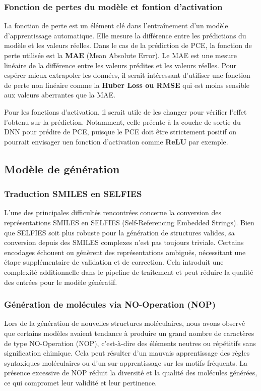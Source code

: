 \subsubsection{Fonction de pertes du modèle et fontion d'activation}
La fonction de perte est un élément clé dans l'entraînement d'un modèle d'apprentissage automatique.
Elle mesure la différence entre les prédictions du modèle et les valeurs réelles.
Dans le cas de la prédiction de PCE, la fonction de perte utilisée est la \textbf{MAE} (Mean Absolute Error).
Le MAE est une mesure linéaire de la différence entre les valeurs prédites et les valeurs réelles.
Pour espérer mieux extrapoler les données, il serait intéressant d'utiliser une fonction de perte non linéaire comme la \textbf{Huber Loss ou RMSE} qui est moins sensible aux valeurs aberrantes que la MAE.

Pour les fonctions d'activation, il serait utile de les changer pour vérifier l'effet l'obtenu sur la prédiction.
Notamment, celle préente à la couche de sortie du DNN pour prédire de PCE, puisque le PCE doit être strictement positif on pourrait envisager uen fonction d'activation comme \textbf{ReLU} par exemple.

\subsection{Modèle de génération}

\subsubsection{Traduction SMILES en SELFIES}

L'une des principales difficultés rencontrées concerne la conversion des représentations SMILES en SELFIES (Self-Referencing Embedded Strings). Bien que SELFIES soit plus robuste pour la génération de structures valides, sa conversion depuis des SMILES complexes n’est pas toujours triviale. Certains encodages échouent ou génèrent des représentations ambiguës, nécessitant une étape supplémentaire de validation et de correction. Cela introduit une complexité additionnelle dans le pipeline de traitement et peut réduire la qualité des entrées pour le modèle génératif.

\subsubsection{Génération de molécules via NO-Operation (NOP)}

Lors de la génération de nouvelles structures moléculaires, nous avons observé que certains modèles avaient tendance à produire un grand nombre de caractères de type NO-Operation (NOP), c’est-à-dire des éléments neutres ou répétitifs sans signification chimique. Cela peut résulter d’un mauvais apprentissage des règles syntaxiques moléculaires ou d’un sur-apprentissage sur les motifs fréquents. La présence excessive de NOP réduit la diversité et la qualité des molécules générées, ce qui compromet leur validité et leur pertinence.
